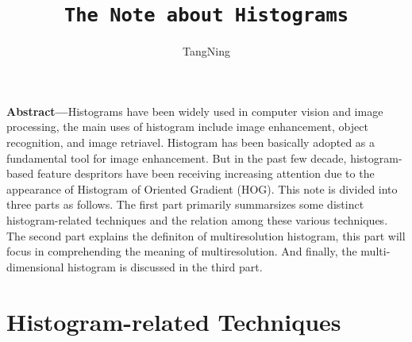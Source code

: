 \documentclass{article}
\title{\texttt{The Note about Histograms}}
\author{TangNing}
\begin{document}
\date{}
\maketitle

\textbf{Abstract---}Histograms have been widely used in computer vision and image processing, the main uses of histogram include image enhancement, object recognition,  and image retriavel. Histogram has been basically adopted as a fundamental tool for image enhancement. But in the past few decade, histogram-based feature despritors have been receiving increasing attention due to the appearance of Histogram of Oriented Gradient (HOG). This note is divided into three parts as follows. The first part primarily summarsizes some distinct histogram-related techniques and the relation among these various techniques. The second part explains the definiton of multiresolution histogram, this part will focus in comprehending the meaning of multiresolution. And finally, the multi-dimensional histogram is discussed in the third part.
\section{Histogram-related Techniques}
\end{document}
